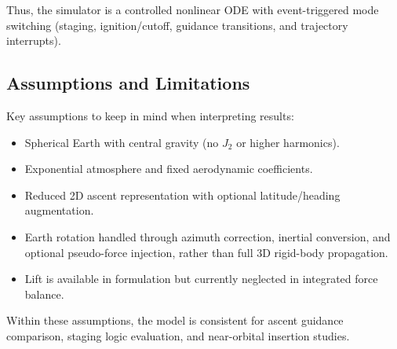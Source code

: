 Thus, the simulator is a controlled nonlinear ODE with event-triggered mode switching (staging, ignition/cutoff, guidance transitions, and trajectory interrupts).

\subsection{Assumptions and Limitations}

Key assumptions to keep in mind when interpreting results:
\begin{itemize}
\item Spherical Earth with central gravity (no $J_2$ or higher harmonics).
\item Exponential atmosphere and fixed aerodynamic coefficients.
\item Reduced 2D ascent representation with optional latitude/heading augmentation.
\item Earth rotation handled through azimuth correction, inertial conversion, and optional pseudo-force injection, rather than full 3D rigid-body propagation.
\item Lift is available in formulation but currently neglected in integrated force balance.
\end{itemize}

Within these assumptions, the model is consistent for ascent guidance comparison, staging logic evaluation, and near-orbital insertion studies.
